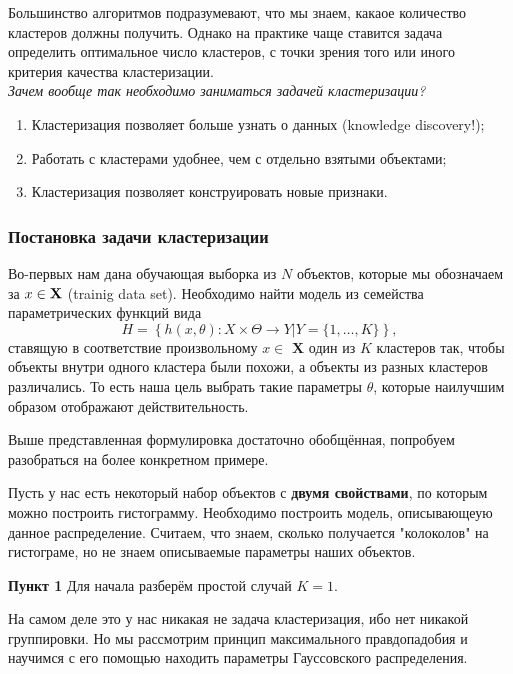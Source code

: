 Большинство алгоритмов подразумевают, что мы знаем, какаое количество кластеров должны получить. Однако на практике чаще ставится задача определить оптимальное число кластеров, с точки зрения того или иного критерия качества кластеризации.\\

{\it Зачем вообще так необходимо заниматься задачей кластеризации?}
\begin{enumerate}
\item Кластеризация позволяет больше узнать о данных (knowledge discovery!);
\item Работать с кластерами удобнее, чем с отдельно взятыми объектами;
\item Кластеризация позволяет конструировать новые признаки.
\end{enumerate}

\subsubsection{Постановка задачи кластеризации}
\begin{Zad} 
Во-первых нам дана обучающая выборка из $N$ объектов, которые мы обозначаем за $x \in {\bf X}$ (trainig data set). 
Необходимо найти модель из семейства параметрических функций вида
\[
H = \left\{h(x,\theta): X \times \Theta \to Y | Y = \{1,\dots,K\}\right\},
\]
ставящую в соответствие произвольному $x \in$ {\bf X} один из $K$ кластеров так, чтобы объекты внутри одного кластера были похожи, а объекты из разных кластеров различались. То есть наша цель выбрать такие параметры $\theta$, которые наилучшим образом отображают действительность.
\end{Zad}

Выше представленная формулировка достаточно обобщённая, попробуем разобраться на более конкретном примере.
\begin{Zad} 
Пусть у нас есть некоторый набор объектов с {\bf двумя свойствами}, по которым можно построить гистограмму. Необходимо построить модель, описывающеую данное распределение. Считаем, что знаем, сколько получается "колоколов" на гистограме, но не знаем описываемые параметры наших объектов.
\end{Zad}

{\bf Пункт 1} Для начала разберём простой случай $K = 1$.%

\begin{Zam} На самом деле это у нас никакая не задача кластеризация, ибо нет никакой группировки. Но мы рассмотрим принцип максимального правдопадобия и научимся с его помощью находить параметры Гауссовского распределения.
\end{Zam}

